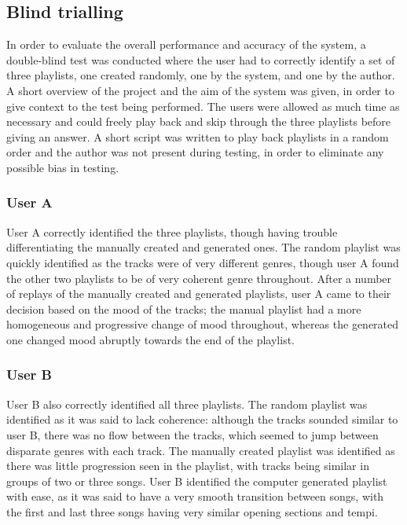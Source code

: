 \subsection{Blind trialling}
In order to evaluate the overall performance and accuracy of the system, a double-blind test was conducted where the user had to correctly identify a set of three playlists, one created randomly, one by the system, and one by the author. A short overview of the project and the aim of the system was given, in order to give context to the test being performed. The users were allowed as much time as necessary and could freely play back and skip through the three playlists before giving an answer. A short script was written to play back playlists in a random order and the author was not present during testing, in order to eliminate any possible bias in testing.
\subsubsection{User A}
User A correctly identified the three playlists, though having trouble differentiating the manually created and generated ones. The random playlist was quickly identified as the tracks were of very different genres, though user A found the other two playlists to be of very coherent genre throughout. After a number of replays of the manually created and generated playlists, user A came to their decision based on the mood of the tracks; the manual playlist had a more homogeneous and progressive change of mood throughout, whereas the generated one changed mood abruptly towards the end of the playlist.
\subsubsection{User B}
User B also correctly identified all three playlists. The random playlist was identified as it was said to lack coherence: although the tracks sounded similar to user B, there was no flow between the tracks, which seemed to jump between disparate genres with each track. The manually created playlist was identified as there was little progression seen in the playlist, with tracks being similar in groups of two or three songs. User B identified the computer generated playlist with ease, as it was said to have a very smooth transition between songs, with the first and last three songs having very similar opening sections and tempi.
